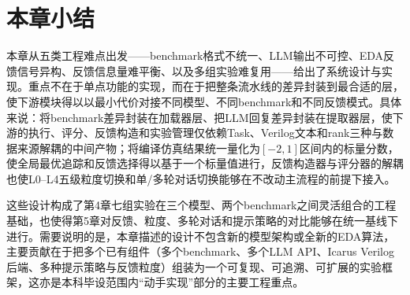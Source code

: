 \section{本章小结}

本章从五类工程难点出发——benchmark格式不统一、LLM输出不可控、EDA反馈信号异构、反馈信息量难平衡、以及多组实验难复用——给出了系统设计与实现。重点不在于单点功能的实现，而在于把整条流水线的差异封装到最合适的层，使下游模块得以以最小代价对接不同模型、不同benchmark和不同反馈模式。具体来说：将benchmark差异封装在加载器层、把LLM回复差异封装在提取器层，使下游的执行、评分、反馈构造和实验管理仅依赖Task、Verilog文本和rank三种与数据来源解耦的中间产物；将编译仿真结果统一量化为$[-2,1]$区间内的标量分数，使全局最优追踪和反馈选择得以基于一个标量值进行，反馈构造器与评分器的解耦也使L0--L4五级粒度切换和单/多轮对话切换能够在不改动主流程的前提下接入。

这些设计构成了第4章七组实验在三个模型、两个benchmark之间灵活组合的工程基础，也使得第5章对反馈、粒度、多轮对话和提示策略的对比能够在统一基线下进行。需要说明的是，本章描述的设计不包含新的模型架构或全新的EDA算法，主要贡献在于把多个已有组件（多个benchmark、多个LLM API、Icarus Verilog后端、多种提示策略与反馈粒度）组装为一个可复现、可追溯、可扩展的实验框架，这亦是本科毕设范围内``动手实现''部分的主要工程重点。
